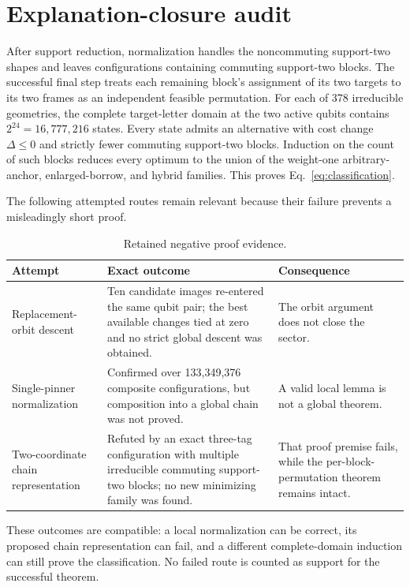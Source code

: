 \section{Explanation-closure audit}
\label{app:explanation-audit}

After support reduction, normalization handles the noncommuting support-two shapes and leaves configurations containing commuting support-two blocks. The successful final step treats each remaining block's assignment of its two targets to its two frames as an independent feasible permutation. For each of 378 irreducible geometries, the complete target-letter domain at the two active qubits contains $2^{24}=16{,}777{,}216$ states. Every state admits an alternative with cost change $\Delta\leq0$ and strictly fewer commuting support-two blocks. Induction on the count of such blocks reduces every optimum to the union of the weight-one arbitrary-anchor, enlarged-borrow, and hybrid families. This proves Eq.~\eqref{eq:classification}.

The following attempted routes remain relevant because their failure prevents a misleadingly short proof.

\begin{table}[h]
\centering
\caption{Retained negative proof evidence.}
\begin{tabularx}{\textwidth}{>{\raggedright\arraybackslash}p{}>{\raggedright\arraybackslash}X>{\raggedright\arraybackslash}p{}}
\toprule
Attempt & Exact outcome & Consequence\\
\midrule
Replacement-orbit descent & Ten candidate images re-entered the same qubit pair; the best available changes tied at zero and no strict global descent was obtained. & The orbit argument does not close the sector.\\
Single-pinner normalization & Confirmed over 133,349,376 composite configurations, but composition into a global chain was not proved. & A valid local lemma is not a global theorem.\\
Two-coordinate chain representation & Refuted by an exact three-tag configuration with multiple irreducible commuting support-two blocks; no new minimizing family was found. & That proof premise fails, while the per-block-permutation theorem remains intact.\\
\bottomrule
\end{tabularx}
\end{table}

These outcomes are compatible: a local normalization can be correct, its proposed chain representation can fail, and a different complete-domain induction can still prove the classification. No failed route is counted as support for the successful theorem.
